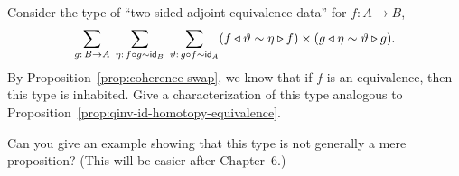 \begin{exr}\fe
    Consider the type of ``two-sided adjoint equivalence data'' for\/ $f\colon A\to B$,
    \[
        \sum_{g\colon B\to A}\;
        \sum_{\eta\colon f\circ g\sim\id_B}\;
        \sum_{\vartheta\colon g\circ f\sim\id_A}
            (f\lwct\vartheta\sim\eta\rwct f)
            \times
            (g\lwct\eta\sim\vartheta\rwct g).
    \]
    By\/ {\upshape Proposition~\ref{prop:coherence-swap}}, we know that if\/ $f$ is an equivalence, then this type is inhabited. Give a characterization of this type analogous to\/ {\upshape Proposition~\ref{prop:qinv-id-homotopy-equivalence}}.

    Can you give an example showing that this type is not generally a mere proposition? (This will be easier after\/ {\upshape Chapter~6}.)
\end{exr}

